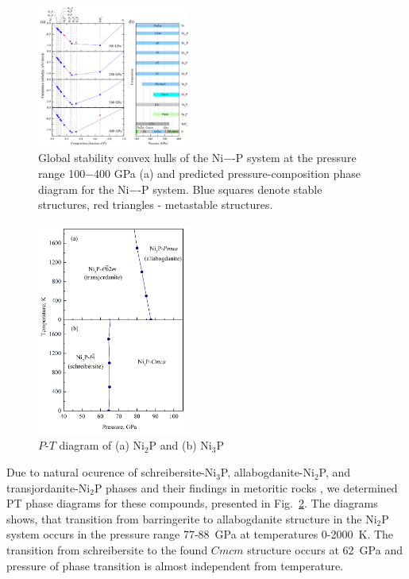 \documentclass[twoside,twocolumn,9pt]{article}
\begin{document}
\begin{figure}
 \centering
 \includegraphics[width=0.45\textwidth]{convex_hull-2.png} %
 \caption{Global stability convex hulls of the Ni−-P system at the pressure range 100−400 GPa (a) and predicted pressure-composition phase diagram for the Ni−-P system. Blue squares denote stable structures, red triangles - metastable structures.}
 \label{fgr:convex_hull}
\end{figure}


\begin{figure}[h]
\centering
  \includegraphics[width=0.45\textwidth]{pt_Ni2P_Ni3P.png}
  \caption{$P$-$T$ diagram of (a) Ni$_2$P and (b) Ni$_3$P}
  \label{fgr:PT-Ni2P-Ni3P}
\end{figure}


Due to natural ocurence of schreibersite-Ni$_3$P, allabogdanite-Ni$_2$P, and transjordanite-Ni$_2$P phases and their findings in metoritic rocks \cite{}, we determined PT phase diagrams for these compounds, presented in Fig.~\ref{fgr:PT-Ni2P-Ni3P}. 
The diagrams shows, that transition from barringerite to allabogdanite structure in the Ni$_2$P system occurs in the pressure range 77-88~GPa at temperatures 0-2000~K.
The transition from schreibersite to the found $Cmcm$ structure occurs at 62~GPa and pressure of phase transition is almost independent from temperature.
\end{document}
